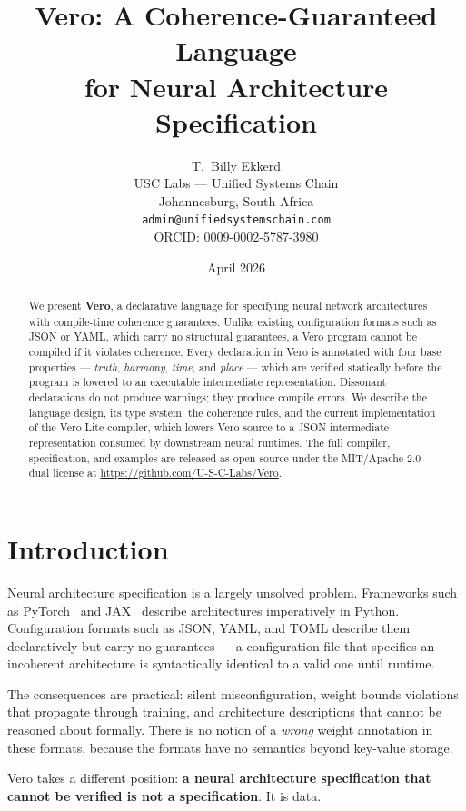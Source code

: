 \documentclass[11pt,a4paper]{article}
\title{\textbf{Vero: A Coherence-Guaranteed Language\\for Neural Architecture Specification}}
\author{
  T.\ Billy Ekkerd \\
  USC Labs --- Unified Systems Chain \\
  Johannesburg, South Africa \\
  \texttt{admin@unifiedsystemschain.com} \\
  ORCID: 0009-0002-5787-3980
}
\date{April 2026}
\begin{document}
\maketitle

\begin{abstract}
We present \textbf{Vero}, a declarative language for specifying neural network architectures
with compile-time coherence guarantees. Unlike existing configuration formats such as JSON or
YAML, which carry no structural guarantees, a Vero program cannot be compiled if it violates
coherence. Every declaration in Vero is annotated with four base properties --- \emph{truth},
\emph{harmony}, \emph{time}, and \emph{place} --- which are verified statically before the
program is lowered to an executable intermediate representation. Dissonant declarations do not
produce warnings; they produce compile errors. We describe the language design, its type system,
the coherence rules, and the current implementation of the Vero Lite compiler, which lowers
Vero source to a JSON intermediate representation consumed by downstream neural runtimes.
The full compiler, specification, and examples are released as open source under the
MIT/Apache-2.0 dual license at \url{https://github.com/U-S-C-Labs/Vero}.
\end{abstract}

\section{Introduction}

Neural architecture specification is a largely unsolved problem. Frameworks such as
PyTorch~\cite{paszke2019pytorch} and JAX~\cite{bradbury2018jax} describe architectures
imperatively in Python. Configuration formats such as JSON, YAML, and TOML describe
them declaratively but carry no guarantees --- a configuration file that specifies an
incoherent architecture is syntactically identical to a valid one until runtime.

The consequences are practical: silent misconfiguration, weight bounds violations that
propagate through training, and architecture descriptions that cannot be reasoned about
formally. There is no notion of a \emph{wrong} weight annotation in these formats, because
the formats have no semantics beyond key-value storage.

Vero takes a different position: \textbf{a neural architecture specification that cannot be
verified is not a specification}. It is data.
\end{document}
